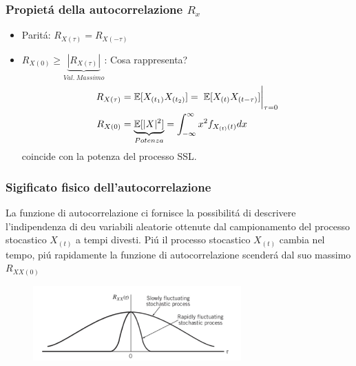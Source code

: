         \subsubsection{Propietá della autocorrelazione $R_x$}
            \begin{itemize}
                \item {Paritá: $R_{X(\tau)} = R_{X(-\tau)}$}
                \item {$R_{X(0)}\geq \underset{Val.\ Massimo}{\underbrace{\left|R_{X(\tau)}\right|}}$: Cosa rappresenta?
                    \begin{align}
                        R_{X(\tau)} &= \mathbb{E}[X_{(t_1)}X_{(t_2)}]=\eval*{\mathbb{E}[X_{(t)}X_{(t-\tau)}] }_{\tau = 0} \nonumber \\
                        R_{X(0)}    &= \underset{Potenza}{\underbrace{\mathbb{E}[|X|^2]}} = \int_{-\infty}^{\infty} x^2f_{X_{(t)}(t)}dx \nonumber
                    \end{align}
                    coincide con la potenza del processo SSL.
                }
            \end{itemize}
        \subsubsection{Sigificato fisico dell'autocorrelazione}
            La funzione di autocorrelazione ci fornisce la possibilitá di descrivere l'indipendenza di deu variabili aleatorie ottenute dal campionamento
            del processo stocastico $X_{(t)}$ a tempi divesti. Piú il processo stocastico $X_{(t)}$ cambia nel tempo, piú rapidamente la funzione di autocorrelazione 
            scenderá dal suo massimo $R_{XX(0)}$
            \begin{figure}[H]
                \centering
                \includegraphics[width = 8cm]{media/autocorrelazione stocastica.png}
            \end{figure}
